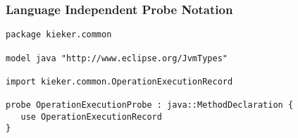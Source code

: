 \begin{frame}[fragile]
\frametitle{Language Independent Probe Notation}
\begin{lstlisting}[escapechar=@,language=ial]
package kieker.common

model java "http://www.eclipse.org/JvmTypes"

import kieker.common.OperationExecutionRecord

probe OperationExecutionProbe : java::MethodDeclaration {
   use OperationExecutionRecord
}
\end{lstlisting}
\end{frame}


